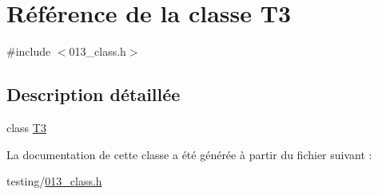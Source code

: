 \hypertarget{class_t3}{}\section{Référence de la classe T3}
\label{class_t3}


{\ttfamily \#include $<$013\+\_\+class.\+h$>$}



\subsection{Description détaillée}
class \hyperlink{class_t3}{T3} 

La documentation de cette classe a été générée à partir du fichier suivant \+:\begin{DoxyCompactItemize}
\item 
testing/\hyperlink{013__class_8h}{013\+\_\+class.\+h}\end{DoxyCompactItemize}
